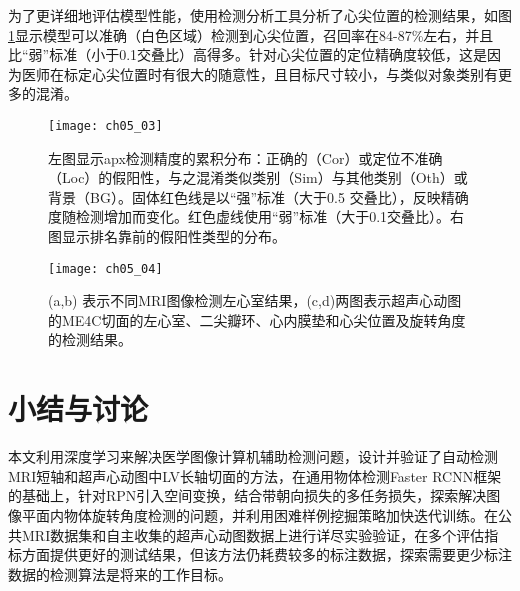 为了更详细地评估模型性能，使用检测分析工具\citep{Hoiem2012}分析了心尖位置的检测结果，如图\ref{fig:ch05_03}显示模型可以准确（白色区域）检测到心尖位置，召回率在84-87\%左右，并且比“弱”标准（小于0.1交叠比）高得多。针对心尖位置的定位精确度较低，这是因为医师在标定心尖位置时有很大的随意性，且目标尺寸较小，与类似对象类别有更多的混淆。
\begin{figure}[!htbp]
\centering
\texttt{[image: ch05\_03]}
\caption{左图显示apx检测精度的累积分布：正确的（Cor）或定位不准确（Loc）的假阳性，与之混淆类似类别（Sim）与其他类别（Oth）或背景（BG）。固体红色线是以“强”标准（大于0.5 交叠比），反映精确度随检测增加而变化。红色虚线使用“弱”标准（大于0.1交叠比）。右图显示排名靠前的假阳性类型的分布。}
\label{fig:ch05_03}
\end{figure} 	                          
 
\begin{figure}[!htbp]
\centering
\texttt{[image: ch05\_04]}
\caption{(a,b) 表示不同MRI图像检测左心室结果，(c,d)两图表示超声心动图的ME4C切面的左心室、二尖瓣环、心内膜垫和心尖位置及旋转角度的检测结果。}
\label{fig:ch05_04}
\end{figure} 	                         
 
\section{小结与讨论}

本文利用深度学习来解决医学图像计算机辅助检测问题，设计并验证了自动检测MRI短轴和超声心动图中LV长轴切面的方法，在通用物体检测Faster RCNN框架的基础上，针对RPN引入空间变换，结合带朝向损失的多任务损失，探索解决图像平面内物体旋转角度检测的问题，并利用困难样例挖掘策略加快迭代训练。在公共MRI数据集和自主收集的超声心动图数据上进行详尽实验验证，在多个评估指标方面提供更好的测试结果，但该方法仍耗费较多的标注数据，探索需要更少标注数据的检测算法是将来的工作目标。